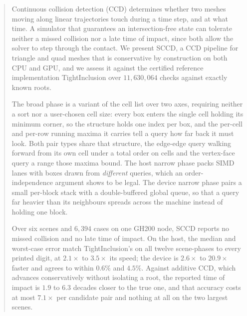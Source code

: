\begin{abstract}
Continuous collision detection (CCD) determines whether two meshes moving along
linear trajectories touch during a time step, and at what time. A simulator that
guarantees an intersection-free state can tolerate neither a missed collision
nor a late time of impact, since both allow the solver to step through the
contact. We present SCCD, a CCD pipeline for triangle and quad meshes that is
conservative by construction on both CPU and GPU, and we assess it against the
certified reference implementation TightInclusion over $11{,}630{,}064$ checks
against exactly known roots.

The broad phase is a variant of the cell list over two axes, requiring neither a
sort nor a user-chosen cell size: every box enters the single cell holding its
minimum corner, so the structure holds one index per box, and the per-cell and
per-row running maxima it carries tell a query how far back it must look. Both
pair types share that structure, the edge-edge query walking forward from its own
cell under a total order on cells and the vertex-face query a range those maxima
bound. The host narrow phase packs SIMD lanes with boxes drawn
from \emph{different} queries, which an order-independence argument shows to be
legal. The device narrow phase pairs a small per-block stack with a
double-buffered global queue, so that a query far heavier than its neighbours
spreads across the machine instead of holding one block.

Over six scenes and $6{,}394$ cases on one \textsc{GH200} node, SCCD reports no
missed collision and no late time of impact. On the host, the median and
worst-case error match TightInclusion's on all twelve scene-phases to every
printed digit, at $2.1\times$ to $3.5\times$ its speed; the device is
$2.6\times$ to $20.9\times$ faster and agrees to within $0.6\%$ and $4.5\%$.
Against additive CCD, which advances conservatively without isolating a root,
the reported time of impact is $1.9$ to $6.3$ decades closer to the true one, and
that accuracy costs at most $7.1\times$ per candidate pair and nothing at all on
the two largest scenes.
\end{abstract}
